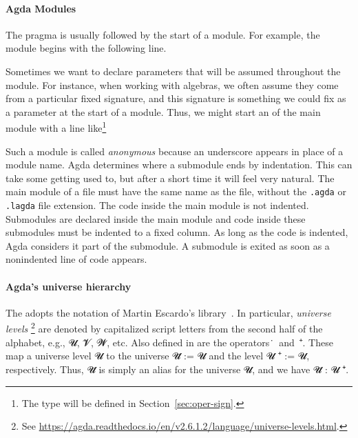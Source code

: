 \paragraph*{Agda Modules}
The  pragma is usually followed by the start of a module.  For example, the  module begins with the following line.
\ccpad
\begin{code}%
\>[0]\AgdaSpace{}%
\AgdaSpace{}%
\<%
\end{code}
\ccpad
Sometimes we want to declare parameters that will be assumed throughout the module.  For instance, when working with algebras, we often assume they come from a particular fixed signature, and this signature is something we could fix as a parameter at the start of a module. Thus, we might start an  of the main module with a line like\footnote{The  type will be defined in Section~\ref{sec:oper-sign}.}
\ccpad
\begin{code}%
\>[0]\AgdaSpace{}%
\AgdaUnderscore\AgdaSpace{}%
\AgdaSymbol{\{}\AgdaSpace{}%
\AgdaSymbol{:}\AgdaSpace{}%
\AgdaSpace{}%
\AgdaSpace{}%
\AgdaSymbol{\}}\AgdaSpace{}%
\<%
\end{code}
\ccpad
Such a module is called \emph{anonymous} because an underscore appears in place of a module name. Agda determines where a submodule ends by indentation.  This can take some getting used to, but after a short time it will feel very natural. The main module of a file must have the same name as the file, without the \texttt{.agda} or \texttt{.lagda} file extension.  The code inside the main module is not indented. Submodules are declared inside the main module and code inside these submodules must be indented to a fixed column.  As long as the code is indented, Agda considers it part of the submodule.  A submodule is exited as soon as a nonindented line of code appears.




\paragraph*{Agda's universe hierarchy}\label{ssec:agdas-universe-hierarchy}
The \agdaualib adopts the notation of Martin Escardo's \typetopology library~\cite{MHE}. In particular, \emph{universe levels}%
\footnote{See \url{https://agda.readthedocs.io/en/v2.6.1.2/language/universe-levels.html}.}
are denoted by capitalized script letters from the second half of the alphabet, e.g., \ab 𝓤, \ab 𝓥, \ab 𝓦, etc.  Also defined in \typetopology are the operators~\af ̇~and~\af ⁺. These map a universe level \ab 𝓤 to the universe \ab 𝓤\af ̇ := \Set \ab 𝓤 and the level \ab 𝓤 \af ⁺ \aod := \lsuc \ab 𝓤, respectively.  Thus, \ab 𝓤\af ̇ is simply an alias for the universe \Set \ab 𝓤, and we have \ab 𝓤\af ̇ \as : \ab 𝓤 \af ⁺\af ̇.

